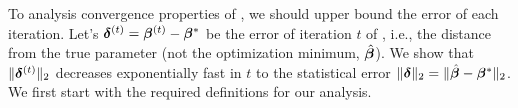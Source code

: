To analysis convergence properties of \dc, we should upper bound the error of each iteration.%
Let's $\boldsymbol{\delta}^{(t)} = \boldsymbol{\beta}^{(t)} - \boldsymbol{\beta}^*$ be the error of  iteration $t$ of \dc, i.e., the distance from the true parameter (not the optimization minimum, $\hat{\boldsymbol{\beta}}$).
We show that $\|\boldsymbol{\delta}^{(t)}\|_{2}$ decreases exponentially fast in $t$ to the statistical error $\|\boldsymbol{\delta}\|_{2} = \|\hat{\boldsymbol{\beta}} - \boldsymbol{\beta}^*\|_{2}$.
We first start with the required definitions for our analysis.

